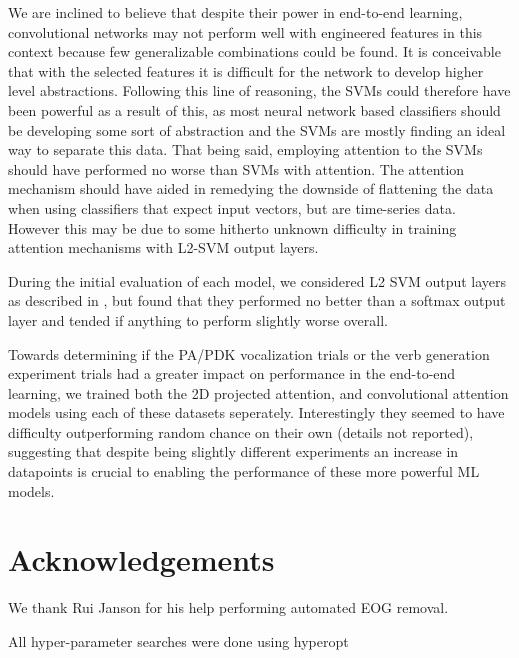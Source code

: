 \documentclass[utf8]{frontiersSCNS} %
\begin{document}

We are inclined to believe that despite their power in end-to-end learning, convolutional networks may not perform well with engineered features in this context because few generalizable combinations could be found. It is conceivable that with the selected features it is difficult for the network to develop higher level abstractions. Following this line of reasoning, the SVMs could therefore have been powerful as a result of this, as most neural network based classifiers should be developing some sort of abstraction and the SVMs are mostly finding an ideal way to separate this data. That being said, employing attention to the SVMs should have performed no worse than SVMs with attention. The attention mechanism should have aided in remedying the downside of flattening the data when using classifiers that expect input vectors, but are time-series data. However this may be due to some hitherto unknown difficulty in training attention mechanisms with L2-SVM output layers.

During the initial evaluation of each model, we considered L2 SVM output layers as described in \cite{l2svmuoftpaper}, but found that they performed no better than a softmax output layer and tended if anything to perform slightly worse overall.

Towards determining if the PA/PDK vocalization trials or the verb generation experiment trials had a greater impact on performance in the end-to-end learning, we trained both the 2D projected attention, and convolutional attention models using each of these datasets seperately. Interestingly they seemed to have difficulty outperforming random chance on their own (details not reported), suggesting that despite being slightly different experiments an increase in datapoints is crucial to enabling the performance of these more powerful ML models.

\section{Acknowledgements}

We thank Rui Janson for his help performing automated EOG removal.


All hyper-parameter searches were done using hyperopt \cite{Bergstra2013}


\end{document}
